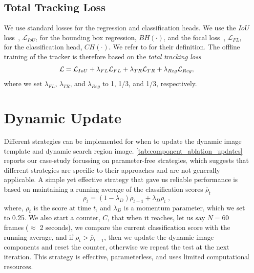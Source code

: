 \subsection{Total Tracking Loss} 
We use standard losses for the regression and classification heads. We use the $IoU$ loss~\cite{rezatofighi2019generalized}, $\mathcal{L}_{IoU}$, for the bounding box regression, $BH(\cdot)$, and the focal loss~\cite{lin2017focal}, $\mathcal{L}_{FL}$, for the classification head, $CH(\cdot)$. We refer to \cite{rezatofighi2019generalized,lin2017focal} for their definition.
The offline training of the tracker is therefore based on the \emph{total tracking loss}
\begin{equation} \small
  \centering
  \label{eq:overall_loss}
          \mathcal{L} =  \mathcal{L}_{IoU} + \lambda_{FL} \mathcal{L}_{FL} + \lambda_{TR} \mathcal{L}_{TR} + \lambda_{Reg} \mathcal{L}_{Reg},
\end{equation}
where we set $\lambda_{FL}$, $\lambda_{TR}$, and $\lambda_{Reg}$ to 1, 1/3, and 1/3, respectively.

\section{Dynamic Update} \label{sec:methods_update} 
Different strategies can be implemented for when to update the dynamic image template and dynamic search region image. \ref{tab:component_ablation_updates} reports our case-study focussing on parameter-free strategies, which suggests that different strategies are specific to their approaches and are not generally applicable. A simple yet effective strategy that gave us reliable performance is based on maintaining a running average of the classification scores $\overline{\rho }_t$
\begin{equation}
  \label{eq:sample_update}
          \overline{\rho }_t = (1-{\lambda}_{D}) \overline{\rho}_{t-1} +  {\lambda}_{D} {\rho}_t \; ,
\end{equation}
where, ${\rho}_t$ is the score at time $t$, and ${\lambda}_{D}$ is a momentum parameter, which we set to 0.25. We also start a counter, $C$, that when it reaches, let us say $N=60$ frames ($\approx$ 2 seconds), we compare the current classification score with the running average, and if ${\rho}_t > \overline{\rho }_{t-1}$, then we update the dynamic image components and reset the counter, otherwise we repeat the test at the next iteration. This strategy is effective, parameterless, and uses limited computational resources.

